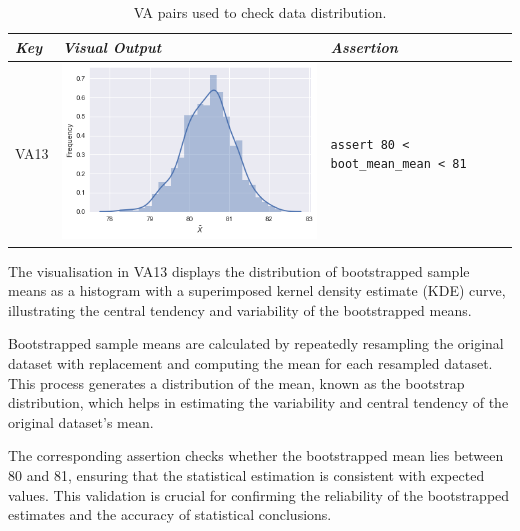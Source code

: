 \begin{table}
  \centering
  \caption{VA pairs used to check data distribution.}
  \begin{tabular}{@{} m{} m{} m{} @{}}
    \toprule
    \emph{\textbf{Key}}&
    \emph{\textbf{Visual Output}}&
    \emph{\textbf{Assertion}}\\
    \midrule

    VA13 &
    \includegraphics[width=\linewidth]{va13.png} &
    \lstinline[]$assert 80 < boot_mean_mean < 81$\\
    \bottomrule
  \end{tabular}
  \label{tab:va-dist-check}
\end{table}

The visualisation in VA13 displays the distribution of bootstrapped sample means as a histogram with a superimposed kernel density estimate (KDE) curve, illustrating the central tendency and variability of the bootstrapped means.

Bootstrapped sample means are calculated by repeatedly resampling the original dataset with replacement and computing the mean for each resampled dataset. This process generates a distribution of the mean, known as the bootstrap distribution, which helps in estimating the variability and central tendency of the original dataset's mean.

The corresponding assertion checks whether the bootstrapped mean lies between 80 and 81, ensuring that the statistical estimation is consistent with expected values. This validation is crucial for confirming the reliability of the bootstrapped estimates and the accuracy of statistical conclusions.

